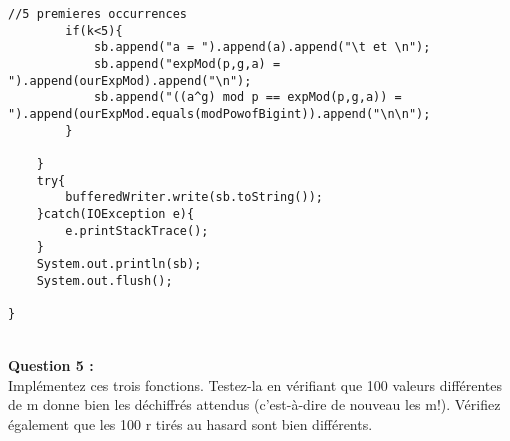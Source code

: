 \documentclass[a4paper,11pt]{article}
\begin{document}
\begin{lstlisting}[caption={testExpMod}, captionpos=b,breaklines = true]
        //5 premieres occurrences
        if(k<5){
            sb.append("a = ").append(a).append("\t et \n");
            sb.append("expMod(p,g,a) = ").append(ourExpMod).append("\n");
            sb.append("((a^g) mod p == expMod(p,g,a)) = ").append(ourExpMod.equals(modPowofBigint)).append("\n\n");
        }

    }
    try{
        bufferedWriter.write(sb.toString());
    }catch(IOException e){
        e.printStackTrace();
    }
    System.out.println(sb);
    System.out.flush();

}\end{lstlisting}

        \textbf{\\Question 5 : \\}Implémentez ces trois fonctions. Testez-la en vérifiant que 100 valeurs différentes de m donne bien les déchiffrés attendus (c’est-à-dire de nouveau les m!). Vérifiez également que les 100 r tirés au hasard sont bien différents.
\end{document}
